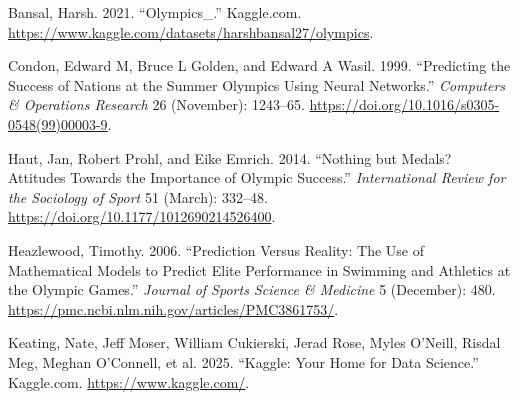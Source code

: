 \documentclass[
]{article}
\newlength{\cslhangindent}
\newenvironment{CSLReferences}[2] %
 {\begin{list}{}{%
  \setlength{\itemindent}{0pt}
  \setlength{\leftmargin}{0pt}
  \setlength{\parsep}{0pt}
  \ifodd #1
   \setlength{\leftmargin}{\cslhangindent}
   \setlength{\itemindent}{-1\cslhangindent}
  \fi
  \setlength{\itemsep}{#2\baselineskip}}}
 {\end{list}}
\begin{document}
\label{refs}
\begin{CSLReferences}{1}{0}
Bansal, Harsh. 2021. {``Olympics\_.''} Kaggle.com. \url{https://www.kaggle.com/datasets/harshbansal27/olympics}.

Condon, Edward M, Bruce L Golden, and Edward A Wasil. 1999. {``Predicting the Success of Nations at the Summer Olympics Using Neural Networks.''} \emph{Computers \& Operations Research} 26 (November): 1243--65. \url{https://doi.org/10.1016/s0305-0548(99)00003-9}.

Haut, Jan, Robert Prohl, and Eike Emrich. 2014. {``Nothing but Medals? Attitudes Towards the Importance of Olympic Success.''} \emph{International Review for the Sociology of Sport} 51 (March): 332--48. \url{https://doi.org/10.1177/1012690214526400}.

Heazlewood, Timothy. 2006. {``Prediction Versus Reality: The Use of Mathematical Models to Predict Elite Performance in Swimming and Athletics at the Olympic Games.''} \emph{Journal of Sports Science \& Medicine} 5 (December): 480. \url{https://pmc.ncbi.nlm.nih.gov/articles/PMC3861753/}.

Keating, Nate, Jeff Moser, William Cukierski, Jerad Rose, Myles O'Neill, Risdal Meg, Meghan O'Connell, et al. 2025. {``Kaggle: Your Home for Data Science.''} Kaggle.com. \url{https://www.kaggle.com/}.

\end{CSLReferences}
\end{document}
